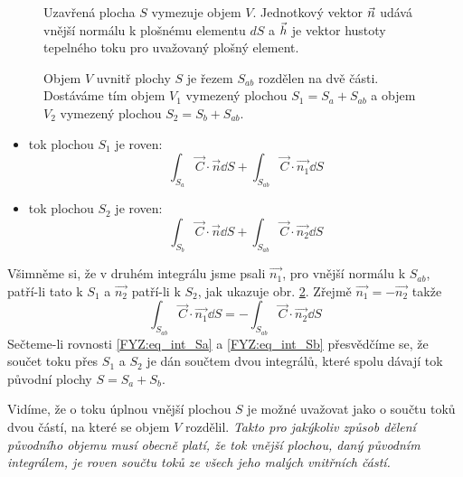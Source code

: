     \begin{figure}
      \centering
      
      \caption{Uzavřená plocha $S$ vymezuje objem $V$. Jednotkový vektor $\protect\vec{n}$ udává 
               vnější normálu k plošnému elementu $dS$ a $\protect\vec{h}$ je vektor hustoty 
               tepelného toku pro uvažovaný plošný element.}
      \label{FYZ:fig_tok_01}
    \end{figure}
    
    \begin{figure}
      \centering
      
      \caption{Objem $V$ uvnitř plochy $S$ je řezem $S_{ab}$ rozdělen na dvě části. Dostáváme tím
               objem $V_1$ vymezený plochou $S_1=S_a+S_{ab}$ a objem $V_2$ vymezený plochou
               $S_2=S_b+S_{ab}$.}
      \label{FYZ:fig_tok_02}      
    \end{figure}
    
    \begin{itemize}
      \item tok plochou $S_1$ je roven:
        \begin{equation}\label{FYZ:eq_int_Sa}
           \int_{S_a}\vec{C}\cdot\vec{n}\dd{S} + \int_{S_{ab}}\vec{C}\cdot\vec{n_1}\dd{S}
        \end{equation}
      \item tok plochou $S_2$ je roven:
         \begin{equation}\label{FYZ:eq_int_Sb}
           \int_{S_b}\vec{C}\cdot\vec{n}\dd{S} + \int_{S_{ab}}\vec{C}\cdot\vec{n_2}\dd{S}
        \end{equation}
    \end{itemize} 
    Všimněme si, že v druhém integrálu jsme psali $\vec{n_1}$, pro vnější normálu k $S_{ab}$, 
    patří-li tato k $S_1$ a $\vec{n_2}$ patří-li k $S_2$, jak ukazuje obr. \ref{FYZ:fig_tok_02}. 
    Zřejmě $\vec{n_1}= -\vec{n_2}$ takže
    \begin{equation}
    \int_{S_{ab}}\vec{C}\cdot\vec{n_1}\dd{S} = - \int_{S_{ab}}\vec{C}\cdot\vec{n_2}\dd{S}
    \end{equation}
    Sečteme-li rovnosti \ref{FYZ:eq_int_Sa} a \ref{FYZ:eq_int_Sb} přesvědčíme se, že součet toku 
    přes $S_1$ a $S_2$ je dán součtem dvou integrálů, které spolu dávají tok původní plochy $S = S_a 
    + S_b$.
    
    Vidíme, že o toku úplnou vnější plochou $S$ je možné uvažovat jako o součtu toků dvou částí, na 
    které se objem $V$ rozdělil. \emph{Takto pro jakýkoliv způsob dělení původního objemu musí 
    obecně platí, že tok vnější plochou, daný původním integrálem, je roven součtu toků ze všech 
    jeho malých vnitřních částí.} 
    
